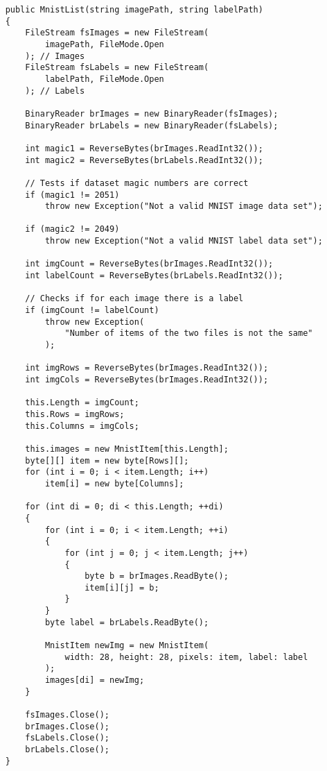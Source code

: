 \begin{verbatim}
    public MnistList(string imagePath, string labelPath)
    {
        FileStream fsImages = new FileStream(
            imagePath, FileMode.Open
        ); // Images
        FileStream fsLabels = new FileStream(
            labelPath, FileMode.Open
        ); // Labels

        BinaryReader brImages = new BinaryReader(fsImages);
        BinaryReader brLabels = new BinaryReader(fsLabels);

        int magic1 = ReverseBytes(brImages.ReadInt32());
        int magic2 = ReverseBytes(brLabels.ReadInt32());

        // Tests if dataset magic numbers are correct
        if (magic1 != 2051)
            throw new Exception("Not a valid MNIST image data set");

        if (magic2 != 2049)
            throw new Exception("Not a valid MNIST label data set");

        int imgCount = ReverseBytes(brImages.ReadInt32());
        int labelCount = ReverseBytes(brLabels.ReadInt32());

        // Checks if for each image there is a label
        if (imgCount != labelCount)
            throw new Exception(
                "Number of items of the two files is not the same"
            );

        int imgRows = ReverseBytes(brImages.ReadInt32());
        int imgCols = ReverseBytes(brImages.ReadInt32());

        this.Length = imgCount;
        this.Rows = imgRows;
        this.Columns = imgCols;

        this.images = new MnistItem[this.Length];
        byte[][] item = new byte[Rows][];
        for (int i = 0; i < item.Length; i++)
            item[i] = new byte[Columns];

        for (int di = 0; di < this.Length; ++di)
        {
            for (int i = 0; i < item.Length; ++i)
            {
                for (int j = 0; j < item.Length; j++)
                {
                    byte b = brImages.ReadByte();
                    item[i][j] = b;
                }
            }
            byte label = brLabels.ReadByte();

            MnistItem newImg = new MnistItem(
                width: 28, height: 28, pixels: item, label: label
            );
            images[di] = newImg;
        }

        fsImages.Close();
        brImages.Close();
        fsLabels.Close();
        brLabels.Close();
    }
\end{verbatim}